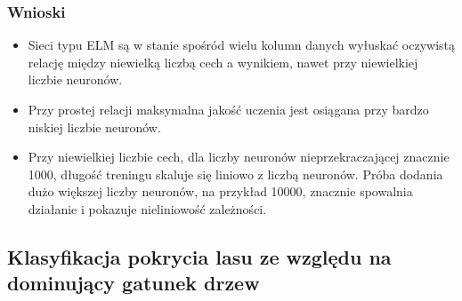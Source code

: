 \documentclass{article}
\begin{document}
\subsubsection{Wnioski}
\begin{itemize}
\item Sieci typu ELM są w stanie spośród wielu kolumn danych wyłuskać oczywistą relację między niewielką liczbą cech a wynikiem, nawet przy niewielkiej liczbie neuronów.
\item Przy prostej relacji maksymalna jakość uczenia jest osiągana przy bardzo niskiej liczbie neuronów.
\item Przy niewielkiej liczbie cech, dla liczby neuronów nieprzekraczającej znacznie 1000, długość treningu skaluje się liniowo z liczbą neuronów. Próba dodania dużo większej liczby neuronów, na przykład 10000, znacznie spowalnia działanie i pokazuje nieliniowość zależności.
\end{itemize}
\subsection{Klasyfikacja pokrycia lasu ze względu na dominujący gatunek drzew}
\end{document}

